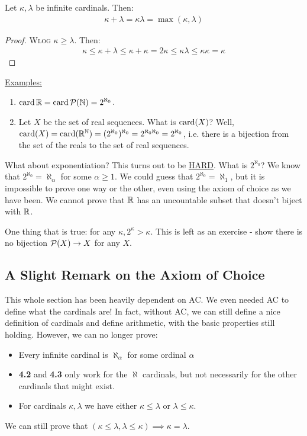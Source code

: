 \documentclass[10pt,a4paper]{article}
\begin{document}
\begin{corollary}
Let $\kappa, \lambda$ be infinite cardinals. Then:
\begin{align*}
\kappa+\lambda = \kappa\lambda = \max(\kappa,\lambda)
\end{align*}
\end{corollary}
\begin{proof}
\textsc{Wlog} $\kappa \geq \lambda$. Then:
\begin{align*}
\kappa \leq \kappa+\lambda \leq \kappa+\kappa = 2\kappa \leq \kappa\lambda\leq \kappa\kappa =\kappa
\end{align*}
\end{proof}
\hspace*{-1em}\underline{Examples:}
\begin{enumerate}
\item $\operatorname{card}{\mathbb{R}} = \operatorname{card}{\mathcal{P}(\mathbb{N})} = 2^{\aleph_0}$.
\item Let $X$ be the set of real sequences. What is $\operatorname{card}(X)$? Well, $\operatorname{card}(X) = \operatorname{card}(\mathbb{R}^{\mathbb{N}}) = (2^{\aleph_0})^{\aleph_0}=2^{\aleph_0\aleph_0}=2^{\aleph_0}$, i.e. there is a bijection from the set of the reals to the set of real sequences.
\end{enumerate}
What about exponentiation? This turns out to be \underline{\underline{HARD}}. What is $2^{\aleph_0}$? We know that $2^{\aleph_0} = \aleph_\alpha$ for some $\alpha \geq 1$. We could guess that $2^{\aleph_0} = \aleph_1$, but it is impossible to prove one way or the other, even using the axiom of choice as we have been. We cannot prove that $\mathbb{R}$ has an uncountable subset that doesn't biject with $\mathbb{R}$.

One thing that is true: for any $\kappa, 2^{\kappa} > \kappa$. This is left as an exercise - show there is no bijection $\mathcal{P}(X) \to X$ for any $X$.

\subsection{A Slight Remark on the Axiom of Choice}
This whole section has been heavily dependent on AC. We even needed AC to define what the cardinals are! In fact, without AC, we can still define a nice definition of cardinals and define arithmetic, with the basic properties still holding. However, we can no longer prove:
\begin{itemize}
\item Every infinite cardinal is $\aleph_\alpha$ for some ordinal $\alpha$
\item \textbf{4.2} and \textbf{4.3} only work for the $\aleph$ cardinals, but not necessarily for the other cardinals that might exist.
\item For cardinals $\kappa, \lambda$ we have either $\kappa \leq \lambda$ or $\lambda \leq \kappa$.
\end{itemize}
We can still prove that $(\kappa\leq\lambda, \lambda\leq\kappa)\implies \kappa=\lambda$.
\end{document}
